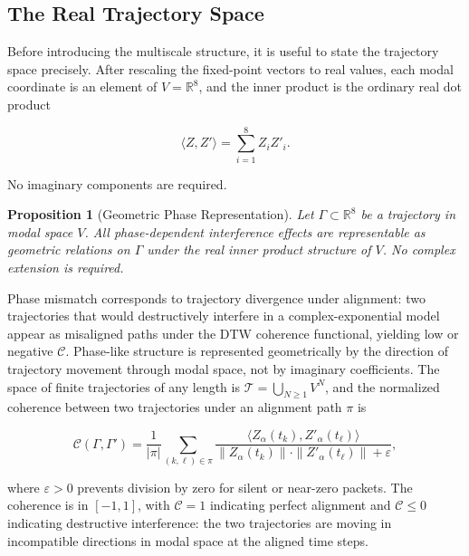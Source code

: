 \documentclass[12pt, a4paper]{article}
\newtheorem{proposition}{Proposition}
\begin{document}
\subsection{The Real Trajectory Space}

Before introducing the multiscale structure, it is useful to state the trajectory space precisely. After rescaling the fixed-point vectors to real values, each modal coordinate is an element of $V = \mathbb{R}^8$, and the inner product is the ordinary real dot product

\begin{equation}
\langle Z, Z' \rangle = \sum_{i=1}^{8} Z_i Z'_i.
\label{eq:ip}
\end{equation}

No imaginary components are required.

\begin{proposition}[Geometric Phase Representation]
Let $\Gamma \subset \mathbb{R}^8$ be a trajectory in modal space $V$. All phase-dependent interference effects are representable as geometric relations on $\Gamma$ under the real inner product structure of $V$. No complex extension is required.
\end{proposition}

Phase mismatch corresponds to trajectory divergence under alignment: two trajectories that would destructively interfere in a complex-exponential model appear as misaligned paths under the DTW coherence functional, yielding low or negative $\mathcal{C}$. Phase-like structure is represented geometrically by the direction of trajectory movement through modal space, not by imaginary coefficients. The space of finite trajectories of any length is $\mathcal{T} = \bigcup_{N \geq 1} V^N$, and the normalized coherence between two trajectories under an alignment path $\pi$ is

\begin{equation}
\mathcal{C}(\Gamma, \Gamma') = \frac{1}{|\pi|} \sum_{(k,\ell) \in \pi} \frac{\langle Z_\alpha(t_k), Z'_\alpha(t_\ell) \rangle}{\|Z_\alpha(t_k)\| \cdot \|Z'_\alpha(t_\ell)\| + \varepsilon},
\label{eq:Cnorm}
\end{equation}

where $\varepsilon > 0$ prevents division by zero for silent or near-zero packets. The coherence is in $[-1, 1]$, with $\mathcal{C} = 1$ indicating perfect alignment and $\mathcal{C} \leq 0$ indicating destructive interference: the two trajectories are moving in incompatible directions in modal space at the aligned time steps.
\end{document}
